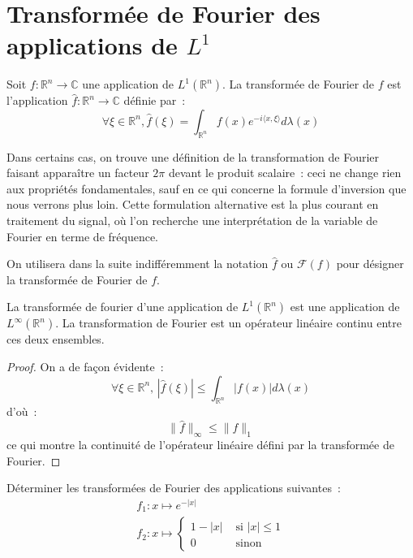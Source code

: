 \section{Transformée de Fourier des applications de $L^1$}
\begin{mandatory}
\begin{defn}
Soit $f : \mathbb{R}^n \to \mathbb{C}$ une application de
$L^1(\mathbb{R}^n)$. La transformée de Fourier de $f$ est
l'application $\widehat{f} : \mathbb{R}^n \to \mathbb{C}$ définie
par~:
\[
\forall \xi \in \mathbb{R}^n, \widehat{f}(\xi) = \int_{\mathbb{R}^n}
f(x) e^{-i \langle x ,\xi \rangle} d \lambda(x)
\]
\end{defn}
\end{mandatory}
\begin{rem}
Dans certains cas, on trouve une définition de la transformation de
Fourier faisant apparaître un facteur $2\pi$ devant le produit
scalaire~: ceci ne change rien aux propriétés fondamentales, sauf en
ce qui concerne la formule d'inversion que nous verrons plus loin. Cette
formulation alternative est la plus courant en traitement du signal, où l'on
recherche une interprétation de la variable de Fourier en terme de fréquence.
\end{rem}
On utilisera dans la suite indifféremment la notation $\widehat{f}$ ou
$\mathcal{F}(f)$ pour désigner la transformée de Fourier de $f$.
\begin{mandatory}
\begin{prop}
La transformée de fourier d'une application de $L^1(\mathbb{R}^n)$ est
une application de $L^\infty(\mathbb{R}^n)$. La transformation de
Fourier est un opérateur linéaire continu entre ces deux ensembles.
\end{prop}
\end{mandatory}
\begin{proof}
On a de façon évidente~:
\[
\forall \xi \in \mathbb{R}^n, \, |\widehat{f}(\xi)| \leq
\int_{\mathbb{R}^n} | f(x) | d\lambda(x)
\]
d'où~:
\[
\| \widehat{f} \|_{\infty} \leq \| f \|_1
\]
ce qui montre la continuité de l'opérateur linéaire défini par la
transformée de Fourier.
\end{proof}
\begin{exercice}
Déterminer les transformées de Fourier des applications suivantes~:
\[
\begin{array}{c}
f_1 \colon x \mapsto e^{-|x|} \\
f_2 \colon x \mapsto \begin{cases}
1-|x| & \text{ si } |x| \leq 1 \\
0 & \text{ sinon }
\end{cases}
\end{array}
\]
\end{exercice}
